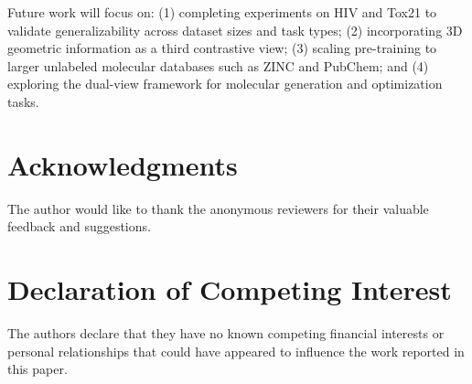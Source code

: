 \documentclass[a4paper,fleqn]{cas-sc}
\begin{document}
Future work will focus on: (1) completing experiments on HIV and Tox21 to validate generalizability across dataset sizes and task types; (2) incorporating 3D geometric information as a third contrastive view; (3) scaling pre-training to larger unlabeled molecular databases such as ZINC and PubChem; and (4) exploring the dual-view framework for molecular generation and optimization tasks.


\printcredits


\section*{Acknowledgments}
The author would like to thank the anonymous reviewers for their valuable feedback and suggestions.


\section*{Declaration of Competing Interest}
The authors declare that they have no known competing financial interests or personal relationships that could have appeared to influence the work reported in this paper.




\end{document}
